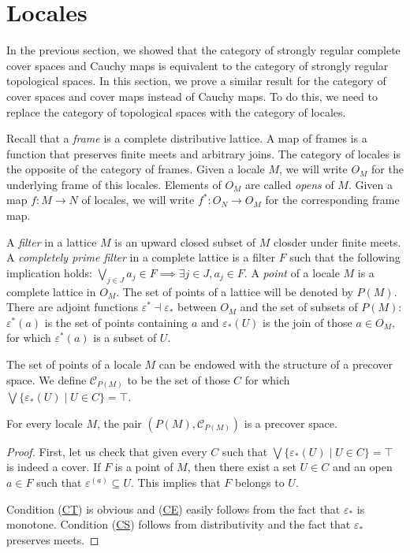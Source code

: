 \documentclass[reqno]{amsart}
\newcommand{\axref}[1]{(\hyperref[ax:#1]{#1})}
\theoremstyle{definition}
\theoremstyle{remark}
\numberwithin{figure}{section}
\begin{document}
\section{Locales}

In the previous section, we showed that the category of strongly regular complete cover spaces and Cauchy maps is equivalent to the category of strongly regular topological spaces.
In this section, we prove a similar result for the category of cover spaces and cover maps instead of Cauchy maps.
To do this, we need to replace the category of topological spaces with the category of locales.

Recall that a \emph{frame} is a complete distributive lattice.
A map of frames is a function that preserves finite meets and arbitrary joins.
The category of locales is the opposite of the category of frames.
Given a locale $M$, we will write $O_M$ for the underlying frame of this locales.
Elements of $O_M$ are called \emph{opens} of $M$.
Given a map $f : M \to N$ of locales, we will write $f^* : O_N \to O_M$ for the corresponding frame map.

A \emph{filter} in a lattice $M$ is an upward closed subset of $M$ closder under finite meets.
A \emph{completely prime filter} in a complete lattice is a filter $F$ such that the following implication holds: $\bigvee_{j \in J} a_j \in F \implies \exists j \in J, a_j \in F$.
A \emph{point} of a locale $M$ is a complete lattice in $O_M$.
The set of points of a lattice will be denoted by $P(M)$.
There are adjoint functions $\varepsilon^* \dashv \varepsilon_*$ between $O_M$ and the set of subsets of $P(M)$:
$\varepsilon^*(a)$ is the set of points containing $a$ and $\varepsilon_*(U)$ is the join of those $a \in O_M$, for which $\varepsilon^*(a)$ is a subset of $U$.

The set of points of a locale $M$ can be endowed with the structure of a precover space.
We define $\mathcal{C}_{P(M)}$ to be the set of those $C$ for which $\bigvee \{ \varepsilon_*(U) \mid U \in C \} = \top$.

\begin{prop}
For every locale $M$, the pair $(P(M),\mathcal{C}_{P(M)})$ is a precover space.
\end{prop}
\begin{proof}
First, let us check that given every $C$ such that $\bigvee \{ \varepsilon_*(U) \mid U \in C \} = \top$ is indeed a cover.
If $F$ is a point of $M$, then there exist a set $U \in C$ and an open $a \in F$ such that $\varepsilon^(a) \subseteq U$.
This implies that $F$ belongs to $U$.

Condition \axref{CT} is obvious and \axref{CE} easily follows from the fact that $\varepsilon_*$ is monotone.
Condition \axref{CS} follows from distributivity and the fact that $\varepsilon_*$ preserves meets.
\end{proof}
\end{document}
